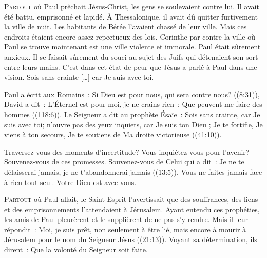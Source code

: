 \lettrine{P}{artout} où Paul prêchait Jésus-Christ,
 les gens se soulevaient contre lui. Il avait été battu, emprisonné et lapidé.
 À Thessalonique, il avait dû quitter furtivement la ville de nuit.
 Les habitants de Bérée l'avaient chassé de leur ville.
 Mais ces endroits étaient encore assez repectueux des lois.
 Corinthe par contre \ocadr la ville où Paul se trouve maintenant \fcadr{} est
 une ville violente et immorale. Paul était sûrement anxieux.
 Il se faisait sûrement du souci au sujet des Juifs qui détenaient
 son sort entre leurs mains. C'est dans cet état de peur que Jésus
 a parlé à Paul dans une vision.
 \Og Sois sans crainte [\dots{}] car Je suis avec toi. \Fg{}


Paul a écrit aux Romains~: 
 \Og Si Dieu est pour nous, qui sera contre nous? \Fg{} ((8:31)),
 David a dit~: 
 \Og L'Éternel est pour moi, je ne crains rien~:
 Que peuvent me faire des hommes \Fg{} ((118:6)).
 Le Seigneur a dit au prophète Ésaïe~: 
 \Og Sois sans crainte, car Je suis avec toi; n'ouvre pas des yeux inquiets,
 car Je suis ton Dieu ; Je te fortifie, Je viens à ton secours,
 Je te soutiens de Ma droite victorieuse \Fg{} ((41:10)).

Traversez-vous des moments d'incertitude? Vous inquiétez-vous pour l'avenir?
 Souvenez-vous de ces promesses. Souvenez-vous de Celui qui a dit~: 
 \Og Je ne te délaisserai jamais, je ne t'abandonnerai jamais \Fg{}
 ((13:5)).
 Vous ne faites jamais face à rien tout seul. Votre Dieu est avec vous.

\dvrule






\lettrine{P}{artout} où Paul allait, le Saint-Esprit l'avertissait
 que des souffrances, des liens et des emprisonnements l'attendaient
 à Jérusalem. Ayant entendu ces prophéties, les amis de Paul pleurèrent
 et le supplièrent de ne pas s'y rendre. Mais il leur répondit~:
 \Og Moi, je suis prêt, non seulement à être lié,
 mais encore à mourir à Jérusalem pour le nom du Seigneur Jésus \Fg{}
 ((21:13)). Voyant sa détermination, ils dirent~: 
 \Og Que la volonté du Seigneur soit faite. \Fg{}

